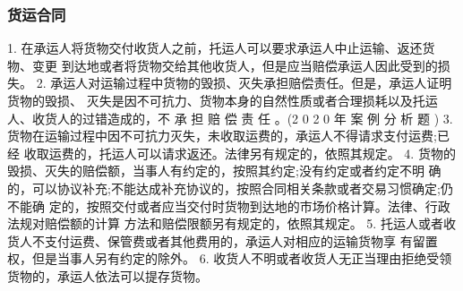 \documentclass[UTF8,12pt]{ctexart}
\numberwithin{equation}{section} %
\numberwithin{figure}{section}
\numberwithin{table}{section}
\begin{document}
	
	\subsubsection{货运合同}
	1. 在承运人将货物交付收货人之前，托运人可以要求承运人中止运输、返还货物、变更 到达地或者将货物交给其他收货人，但是应当赔偿承运人因此受到的损失。
	2. 承运人对运输过程中货物的毁损、灭失承担赔偿责任。但是，承运人证明货物的毁损、 灭失是因不可抗力、货物本身的自然性质或者合理损耗以及托运人、收货人的过错造成的，不 承 担 赔 偿 责 任 。(2 0 2 0 年 案 例 分 析 题 )
	3. 货物在运输过程中因不可抗力灭失，未收取运费的，承运人不得请求支付运费;已经 收取运费的，托运人可以请求返还。法律另有规定的，依照其规定。
	4. 货物的毁损、灭失的赔偿额，当事人有约定的，按照其约定;没有约定或者约定不明 确的，可以协议补充;不能达成补充协议的，按照合同相关条款或者交易习惯确定;仍不能确 定的，按照交付或者应当交付时货物到达地的市场价格计算。法律、行政法规对赔偿额的计算 方法和赔偿限额另有规定的，依照其规定。
	5. 托运人或者收货人不支付运费、保管费或者其他费用的，承运人对相应的运输货物享 有留置权，但是当事人另有约定的除外。
	6. 收货人不明或者收货人无正当理由拒绝受领货物的，承运人依法可以提存货物。
	
	
\end{document}
